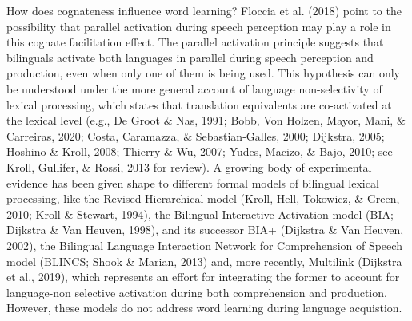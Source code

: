 \documentclass[english,man,man,floatsintext]{apa6}
\begin{document}
How does cognateness influence word learning? Floccia et al. (2018) point to the possibility that parallel activation during speech perception may play a role in this cognate facilitation effect. The parallel activation principle suggests that bilinguals activate both languages in parallel during speech perception and production, even when only one of them is being used. This hypothesis can only be understood under the more general account of language non-selectivity of lexical processing, which states that translation equivalents are co-activated at the lexical level (e.g., De Groot \& Nas, 1991; Bobb, Von Holzen, Mayor, Mani, \& Carreiras, 2020; Costa, Caramazza, \& Sebastian-Galles, 2000; Dijkstra, 2005; Hoshino \& Kroll, 2008; Thierry \& Wu, 2007; Yudes, Macizo, \& Bajo, 2010; see Kroll, Gullifer, \& Rossi, 2013 for review). A growing body of experimental evidence has been given shape to different formal models of bilingual lexical processing, like the Revised Hierarchical model (Kroll, Hell, Tokowicz, \& Green, 2010; Kroll \& Stewart, 1994), the Bilingual Interactive Activation model (BIA; Dijkstra \& Van Heuven, 1998), and its successor BIA+ (Dijkstra \& Van Heuven, 2002), the Bilingual Language Interaction Network for Comprehension of Speech model (BLINCS; Shook \& Marian, 2013) and, more recently, Multilink (Dijkstra et al., 2019), which represents an effort for integrating the former to account for language-non selective activation during both comprehension and production. However, these models do not address word learning during language acquistion.
\end{document}
